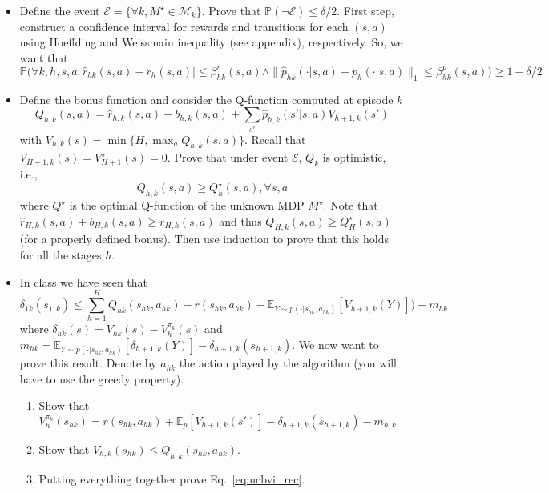 \documentclass[a4paper]{article}
\newcommand{\wh}[1]{\widehat{#1}}
\begin{document}
\begin{itemize}
    \item Define the event $\mathcal{E} = \{\forall k, M^\star \in \mathcal{M}_k\}$. Prove that $\mathbb{P}(\neg\mathcal{E}) \leq \delta/2$. First step, construct a confidence interval for rewards and transitions for each $(s,a)$ using Hoeffding and Weissmain inequality (see appendix), respectively. So, we want that
    \[
        \mathbb{P}\Big(\forall k,h,s,a : \wh{r}_{hk}(s,a) - r_h(s,a)| \leq \beta_{hk}^r(s,a) \wedge \|\wh{p}_{hk}(\cdot|s,a) - p_{h}(\cdot|s,a)\|_1\leq \beta_{hk}^p(s,a)\Big) \geq 1-\delta/2
    \]
    
    \item Define the bonus function and consider the Q-function computed at episode $k$
    \[
        Q_{h,k}(s,a) = \wh{r}_{h,k}(s,a) + b_{h,k}(s,a) + \sum_{s'} \wh{p}_{h,k}(s'|s,a) V_{h+1,k}(s')
    \]
    with $V_{h,k}(s) = \min\{H, \max_a Q_{h,k}(s,a)\}$. Recall that $V_{H+1,k}(s) = V_{H+1}^\star(s) = 0$.
    Prove that under event $\mathcal{E}$, $Q_k$ is optimistic, i.e.,
    \[
        Q_{h,k}(s,a) \geq Q^{\star}_h(s,a), \forall s,a
    \]
    where $Q^\star$ is the optimal Q-function of the unknown MDP $M^\star$.
    Note that $\wh{r}_{H,k}(s,a) + b_{H,k}(s,a) \geq r_{H,k}(s,a)$ and thus $Q_{H,k}(s,a) \geq Q^\star_H(s,a)$ (for a properly defined bonus). Then use induction to prove that this holds for all the stages $h$.

    \item In class we have seen that
    \begin{equation}
        \label{eq:ucbvi_rec}
        \delta_{1k}(s_{1,k}) \leq \sum_{h=1}^H Q_{hk}(s_{hk},a_{hk}) - r(s_{hk},a_{hk}) - \mathbb{E}_{Y\sim p(\cdot|s_{hk},a_{hk})}[V_{h+1,k}(Y)]) + m_{hk}
    \end{equation}
    where $\delta_{hk}(s)=V_{hk}(s) - V_h^{\pi_k}(s)$ and $m_{hk} = \mathbb{E}_{Y\sim p(\cdot|s_{hk},a_{hk})}[\delta_{h+1,k}(Y)] - \delta_{h+1,k}(s_{h+1,k})$.
    We now want to prove this result. Denote by $a_{hk}$ the action played by the algorithm (you will have to use the greedy property).
    \begin{enumerate}
        \item Show that $V^{\pi_{k}}_h(s_{hk}) = r(s_{hk},a_{hk}) + \mathbb{E}_{p}[V_{h+1,k}(s')] - \delta_{h+1,k}(s_{h+1,k}) - m_{h,k}$
        \item Show that $V_{h,k}(s_{hk}) \leq Q_{h,k}(s_{hk},a_{hk})$.
        \item Putting everything together prove Eq.~\ref{eq:ucbvi_rec}.
    \end{enumerate}


\end{itemize}
\end{document}
